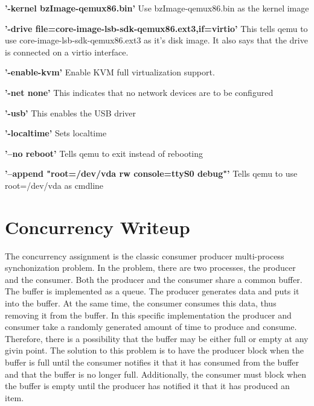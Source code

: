 \documentclass[letterpaper,draftclsnofoot,onecolumn,10pt]{article}
\begin{document}
\textbf{'-kernel bzImage-qemux86.bin'}
\newline
Use bzImage-qemux86.bin as the kernel image

\textbf{'-drive file=core-image-lsb-sdk-qemux86.ext3,if=virtio'}
\newline
This tells qemu to use core-image-lsb-sdk-qemux86.ext3 as it's disk image. It also says that the drive is connected on a virtio interface.

\textbf{'-enable-kvm'}
\newline
Enable KVM full virtualization support.

\textbf{'-net none'}
\newline
This indicates that no network devices are to be configured

\textbf{'-usb'}
\newline
This enables the USB driver

\textbf{'-localtime'}
\newline
Sets localtime

\textbf{'--no reboot'}
\newline
Tells qemu to exit instead of rebooting

\textbf{'--append "root=/dev/vda rw console=ttyS0 debug"'}
\newline
Tells qemu to use root=/dev/vda as cmdline

\section{Concurrency Writeup}

The concurrency assignment is the classic consumer producer multi-process synchonization problem. In the problem, there are two processes, the producer and the consumer. Both the producer and the consumer share a common buffer. The buffer is implemented as a queue. The producer generates data and puts it into the buffer. At the same time, the consumer consumes this data, thus removing it from the buffer. In this specific implementation the producer and consumer take a randomly generated amount of time to produce and consume. Therefore, there is a possibility that the buffer may be either full or empty at any givin point. The solution to this problem is to have the producer block when the buffer is full until the consumer notifies it that it has consumed from the buffer and that the buffer is no longer full. Additionally, the consumer must block when the buffer is empty until the producer has notified it that it has produced an item.
\end{document}
